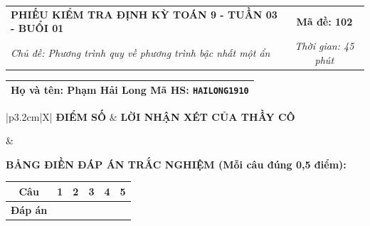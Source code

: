 \documentclass[12pt,a4paper]{article}
\begin{document}
\newpage


\noindent
\begin{tabularx}{\linewidth}{|X|c|}
\hline
\textbf{PHIẾU KIỂM TRA ĐỊNH KỲ TOÁN 9 - TUẦN 03 - BUỔI 01} & \textbf{Mã đề: 102} \\
\textit{Chủ đề: Phương trình quy về phương trình bậc nhất một ẩn} & \textit{Thời gian: 45 phút} \\
\hline
\end{tabularx}

\vspace{1mm}

\noindent
\begin{tabularx}{\linewidth}{|X|}
\hline
\rule[-2mm]{0pt}{7.5mm}\textbf{Họ và tên:} \textbf{\large Phạm Hải Long} \hfill \textbf{Mã HS:} \texttt{HAILONG1910} \quad \\
\hline
\end{tabularx}

\vspace{1mm}

\noindent
\begin{tabularx}{\linewidth}{|p{3.2cm}|X|}
\hline
\centering\textbf{ĐIỂM SỐ} & \centering\textbf{LỜI NHẬN XÉT CỦA THẦY CÔ} \tabularnewline
\hline
\rule{0pt}{1.3cm} & \tabularnewline
\hline
\end{tabularx}

\vspace{1.2mm}

\noindent\textbf{BẢNG ĐIỀN ĐÁP ÁN TRẮC NGHIỆM (Mỗi câu đúng 0,5 điểm):}
\vspace{0.8mm}

\noindent
\renewcommand{\arraystretch}{1.35}
\begin{tabularx}{\linewidth}{|c|*{5}{>{\centering\arraybackslash}X|}}
\hline
\textbf{Câu} & \textbf{1} & \textbf{2} & \textbf{3} & \textbf{4} & \textbf{5} \\
\hline
\textbf{Đáp án} & & & & & \\
\hline
\end{tabularx}
\renewcommand{\arraystretch}{1.0}

\vspace{1.5mm}
\end{document}
